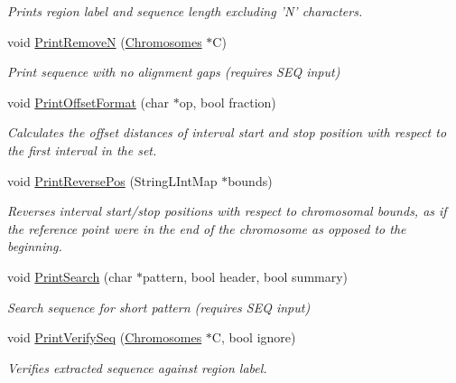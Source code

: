 \begin{DoxyCompactItemize}
\begin{DoxyCompactList}\small\item\em Prints region label and sequence length excluding 'N' characters. \end{DoxyCompactList}\item 
void \hyperlink{classGenomicRegionSet_a6dc7150acdd7a0614f8a8497da687d0e}{PrintRemoveN} (\hyperlink{classChromosomes}{Chromosomes} $\ast$C)
\begin{DoxyCompactList}\small\item\em Print sequence with no alignment gaps (requires SEQ input) \end{DoxyCompactList}\item 
void \hyperlink{classGenomicRegionSet_ae27a5c9f17f08afae277603e33d4fb91}{PrintOffsetFormat} (char $\ast$op, bool fraction)
\begin{DoxyCompactList}\small\item\em Calculates the offset distances of interval start and stop position with respect to the first interval in the set. \end{DoxyCompactList}\item 
\hypertarget{classGenomicRegionSet_ac8de83151ba0cc30ca1b72e83ecea82f}{
void \hyperlink{classGenomicRegionSet_ac8de83151ba0cc30ca1b72e83ecea82f}{PrintReversePos} (StringLIntMap $\ast$bounds)}
\label{classGenomicRegionSet_ac8de83151ba0cc30ca1b72e83ecea82f}

\begin{DoxyCompactList}\small\item\em Reverses interval start/stop positions with respect to chromosomal bounds, as if the reference point were in the end of the chromosome as opposed to the beginning. \end{DoxyCompactList}\item 
\hypertarget{classGenomicRegionSet_adfbad7f0acf42c2179bd33103e5d183c}{
void \hyperlink{classGenomicRegionSet_adfbad7f0acf42c2179bd33103e5d183c}{PrintSearch} (char $\ast$pattern, bool header, bool summary)}
\label{classGenomicRegionSet_adfbad7f0acf42c2179bd33103e5d183c}

\begin{DoxyCompactList}\small\item\em Search sequence for short pattern (requires SEQ input) \end{DoxyCompactList}\item 
\hypertarget{classGenomicRegionSet_a4c197a09ffcace2ec2736aa089eec448}{
void \hyperlink{classGenomicRegionSet_a4c197a09ffcace2ec2736aa089eec448}{PrintVerifySeq} (\hyperlink{classChromosomes}{Chromosomes} $\ast$C, bool ignore)}
\label{classGenomicRegionSet_a4c197a09ffcace2ec2736aa089eec448}

\begin{DoxyCompactList}\small\item\em Verifies extracted sequence against region label. \end{DoxyCompactList}\end{DoxyCompactItemize}

